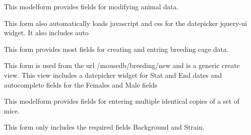 \documentclass[letterpaper,10pt,english]{sphinxmanual}
\begin{document}
\begin{fulllineitems}
\label{animals:mousedb.animal.forms.AnimalForm}
This modelform provides fields for modifying animal data.

This form also automatically loads javascript and css for the datepicker jquery-ui widget.  It also includes auto

\end{fulllineitems}


\begin{fulllineitems}
\label{animals:mousedb.animal.forms.BreedingForm}
This form provides most fields for creating and entring breeding cage data.

This form is used from the url /mousedb/breeding/new and is a generic create view.  This view includes a datepicker widget for Stat and End dates and autocomplete fields for the Females and Male fields

\end{fulllineitems}


\begin{fulllineitems}
\label{animals:mousedb.animal.forms.MultipleAnimalForm}
This modelform provides fields for entering multiple identical copies of a set of mice.

This form only includes the required fields Background and Strain.

\end{fulllineitems}
\end{document}
